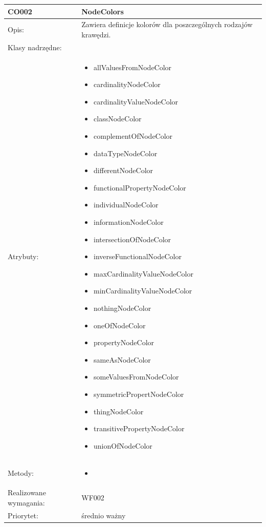 \documentclass[a4paper,10pt]{article}
\begin{document}
\begin{center}
\begin{longtable}{|m{3cm}|m{9cm}|}
CO002 & NodeColors \\ \hline
Opis: & Zawiera definicje kolorów dla poszczególnych rodzajów krawędzi.   \\ \hline
Klasy nadrzędne: &     \\ \hline
Atrybuty: & \begin{itemize}
 \item allValuesFromNodeColor
 \item cardinalityNodeColor
 \item cardinalityValueNodeColor
 \item classNodeColor
 \item complementOfNodeColor
 \item dataTypeNodeColor
 \item differentNodeColor
 \item functionalPropertyNodeColor
 \item individualNodeColor
 \item informationNodeColor
 \item intersectionOfNodeColor
 \item inverseFunctionalNodeColor
 \item maxCardinalityValueNodeColor
 \item minCardinalityValueNodeColor
 \item nothingNodeColor
 \item oneOfNodeColor
 \item propertyNodeColor
 \item sameAsNodeColor
 \item someValuesFromNodeColor
 \item symmetricPropertNodeColor
 \item thingNodeColor
 \item transitivePropertyNodeColor
 \item unionOfNodeColor 
\end{itemize}
 \\ \hline
Metody: & \begin{itemize}
 \item 
\end{itemize}
  \\ \hline
Realizowane wymagania: & WF002 \\ \hline
Priorytet: & średnio ważny \\ \hline


\end{longtable}


\end{center}
\end{document}
